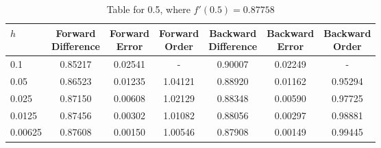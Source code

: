 \begin{table}
\centering
\caption{Table for 0.5, where $f'(0.5) = 0.87758$}
\begin{tabular}{lcccccc}
\toprule
    $h$ & \makecell{Forward \\ Difference} & \makecell{Forward \\ Error} & \makecell{Forward \\ Order} & \makecell{Backward \\ Difference} & \makecell{Backward \\ Error} & \makecell{Backward \\ Order} \\
\midrule
    0.1 &                          0.85217 &                     0.02541 &                           - &                           0.90007 &                      0.02249 &                            - \\
   0.05 &                          0.86523 &                     0.01235 &                     1.04121 &                           0.88920 &                      0.01162 &                      0.95294 \\
  0.025 &                          0.87150 &                     0.00608 &                     1.02129 &                           0.88348 &                      0.00590 &                      0.97725 \\
 0.0125 &                          0.87456 &                     0.00302 &                     1.01082 &                           0.88056 &                      0.00297 &                      0.98881 \\
0.00625 &                          0.87608 &                     0.00150 &                     1.00546 &                           0.87908 &                      0.00149 &                      0.99445 \\
\bottomrule
\end{tabular}
\end{table}
